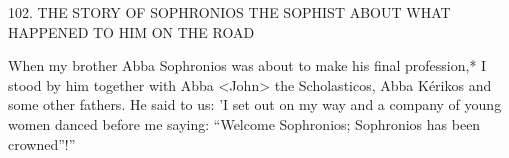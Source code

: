 102. THE STORY OF SOPHRONIOS THE SOPHIST
ABOUT WHAT HAPPENED TO HIM ON THE ROAD

When my brother Abba Sophronios was about to make his final
profession,* I stood by him together with Abba <John> the
Scholasticos, Abba Kérikos and some other fathers. He said to us:
'I set out on my way and a company of young women danced
before me saying: “Welcome Sophronios; Sophronios has been
crowned”!”

